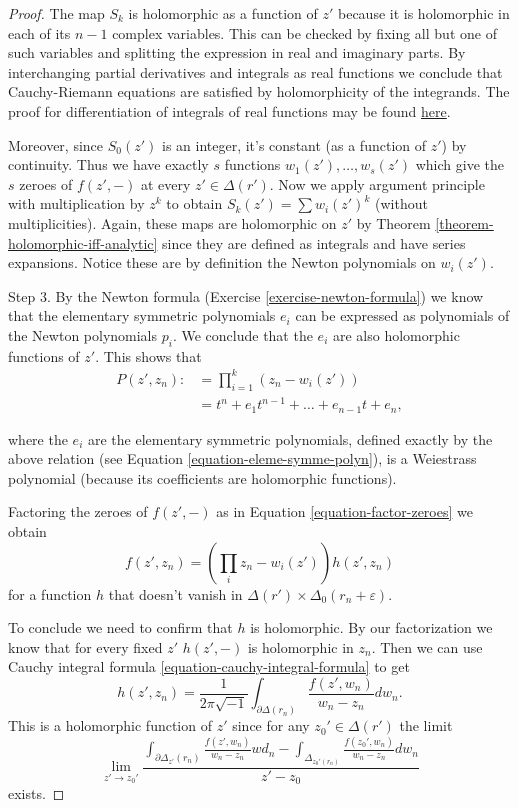 \begin{proof}
The map $S_k$ is holomorphic as a function of
$z'$ because
it is holomorphic in each of its $n-1$
complex variables.
This can be checked by fixing all but one of
such variables
and splitting the expression in real and
imaginary parts.
By interchanging partial derivatives and
integrals as real functions
we conclude that Cauchy-Riemann equations are
satisfied
by holomorphicity of the integrands.
The proof for differentiation of integrals of
real functions may be found
\href{https://en.wikipedia.org/wiki/%
Leibniz_integral_rule#Proof_of_basic_form}
{here}.

Moreover, since
$S_0(z')$ is an integer,
it's constant (as a function of $z'$) by
continuity.
Thus we have exactly $s$ functions
$w_1(z'),\ldots,w_s(z')$ which give the $s$
zeroes of $f(z',-)$
at every $z' \in \Delta(r')$.
Now we apply argument principle with
multiplication by
$z^k$ to obtain $S_k(z')=\sum w_i(z')^k$
(without multiplicities).
Again, these maps are holomorphic on $z'$ by
Theorem
\ref{theorem-holomorphic-iff-analytic} since
they are defined as integrals
and have series expansions.
Notice these are by definition the Newton
polynomials on $w_i(z')$.

\medskip\noindent
Step 3.
By the Newton formula (Exercise
\ref{exercise-newton-formula})
we know that the elementary symmetric
polynomials $e_i$ can be expressed
as polynomials of the Newton polynomials
$p_i$.
We conclude that the $e_i$ are also
holomorphic functions of $z'$.
This shows that
$$
\begin{aligned}
P(z',z_n):&=\prod_{i=1}^k(z_n-w_i(z'))\\
&=t^n+e_1t^{n-1}+\ldots+e_{n-1}t+e_n,
\end{aligned}
$$

\noindent
where the $e_i$ are the elementary symmetric
polynomials,
defined exactly by the above relation (see
Equation \ref{equation-eleme-symme-polyn}),
is a Weiestrass polynomial
(because its coefficients are holomorphic
functions).

Factoring the zeroes of $f(z',-)$ as in
Equation \ref{equation-factor-zeroes}
we obtain
$$
f(z',z_n)=\left(\prod_{i}z_n-w_i(z')\right)
h(z',z_n)
$$
for a function $h$ that doesn't vanish in
$\Delta(r')\times \Delta_0(r_n+\varepsilon)$.

To conclude we need to confirm that $h$ is
holomorphic.
By our factorization we know that for every
fixed $z'$
$h(z',-)$ is holomorphic in $z_n$.
Then we can use Cauchy integral formula
\ref{equation-cauchy-integral-formula}
to get
$$
h(z',z_n)=\frac{1}{2\pi\sqrt{-1}}
\int_{\partial\Delta(r_n)}\frac{f(z',w_n)}
{w_n-z_n}dw_n.
$$
This is a holomorphic function of $z'$ since
for any $z_0' \in \Delta(r')$ the limit
$$
\lim_{z'\to z_0'}
\frac{
\int_{\partial\Delta_{z'}(r_n)}
\frac{f(z',w_n)}{w_n-z_n}wd_n
-
\int_{\Delta_{z_0'(r_n)}}
\frac{f(z_0',w_n)}{w_n-z_n}dw_n}
{z'-z_0}
$$
exists.


\end{proof}

